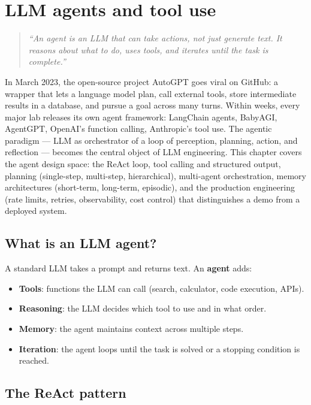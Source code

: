\chapter{LLM agents and tool use}
\label{ch:agents}

\begin{quote}
\emph{``An agent is an LLM that can take actions, not just generate text. It reasons about what to do, uses tools, and iterates until the task is complete.''}
\end{quote}

In March 2023, the open-source project AutoGPT goes viral on GitHub: a wrapper that lets a language model plan, call external tools, store intermediate results in a database, and pursue a goal across many turns. Within weeks, every major lab releases its own agent framework: LangChain agents, BabyAGI, AgentGPT, OpenAI's function calling, Anthropic's tool use. The agentic paradigm --- LLM as orchestrator of a loop of perception, planning, action, and reflection --- becomes the central object of LLM engineering. This chapter covers the agent design space: the ReAct loop, tool calling and structured output, planning (single-step, multi-step, hierarchical), multi-agent orchestration, memory architectures (short-term, long-term, episodic), and the production engineering (rate limits, retries, observability, cost control) that distinguishes a demo from a deployed system.

\section{What is an LLM agent?}

A standard LLM takes a prompt and returns text. An \textbf{agent} adds:
\begin{itemize}
  \item \textbf{Tools}: functions the LLM can call (search, calculator, code execution, APIs).
  \item \textbf{Reasoning}: the LLM decides which tool to use and in what order.
  \item \textbf{Memory}: the agent maintains context across multiple steps.
  \item \textbf{Iteration}: the agent loops until the task is solved or a stopping condition is reached.
\end{itemize}

\section{The ReAct pattern}

